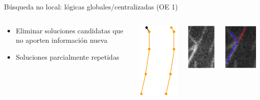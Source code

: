 \begin{frame}{B\'usqueda no local: l\'ogicas globales/centralizadas (OE 1)}
    
    \begin{columns}
        \begin{column}{0.4\textwidth}
            \begin{itemize}
                \item Eliminar soluciones candidatas que no aporten informaci\'on nueva
                \item Soluciones parcialmente repetidas
            \end{itemize}
        \end{column}
        \begin{column}{0.2\textwidth}
        \includegraphics[scale=0.5]{Pictures/ant-segments-repetead-sol1.png}
        \end{column}
        \begin{column}{0.2\textwidth}
        \includegraphics[scale=0.5]{Pictures/NoConsenso2.png}
        \end{column}
        \begin{column}{0.2\textwidth}
        \includegraphics[scale=0.5]{Pictures/NoConsenso3.png}

\end{column}
\end{columns}
\end{frame}

